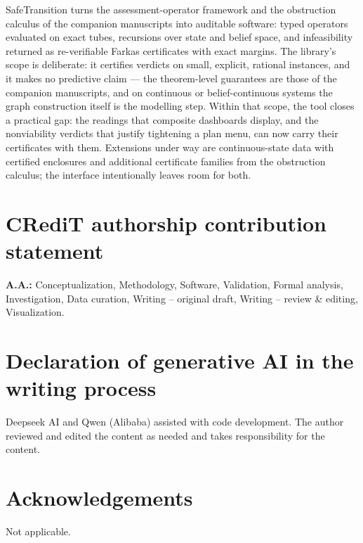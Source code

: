 \documentclass[3p,11pt]{elsarticle}
\begin{document}
SafeTransition turns the assessment-operator framework and the obstruction
calculus of the companion manuscripts into auditable software: typed
operators evaluated on exact tubes, recursions over state and belief space,
and infeasibility returned as re-verifiable Farkas certificates with exact
margins. The library's scope is deliberate: it certifies verdicts on small,
explicit, rational instances, and it makes no predictive claim --- the
theorem-level guarantees are those of the companion manuscripts, and on
continuous or belief-continuous systems the graph construction itself is
the modelling step. Within that scope, the tool closes a practical gap:
the readings that composite dashboards display, and the nonviability
verdicts that justify tightening a plan menu, can now carry their
certificates with them. Extensions under way are continuous-state data with
certified enclosures and additional certificate families from the
obstruction calculus; the interface intentionally leaves room for both.

\section*{CRediT authorship contribution statement}
\textbf{A.A.:} Conceptualization, Methodology, Software, Validation,
Formal analysis, Investigation, Data curation, Writing -- original draft,
Writing -- review \& editing, Visualization.

\section*{Declaration of generative AI in the writing process}
Deepseek AI and Qwen (Alibaba) assisted with code development. The author
reviewed and edited the content as needed and takes responsibility for the
content.

\section*{Acknowledgements}
Not applicable.
\end{document}
